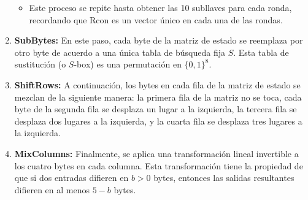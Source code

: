 \begin{enumerate}
\begin{itemize}
        \item Este proceso se repite hasta obtener las 10 subllaves para cada ronda, recordando que Rcon es un vector único en cada una de las rondas.
    \end{itemize}
    
    \item \textbf{SubBytes:} En este paso, cada byte de la matriz de estado se reemplaza por otro byte de acuerdo a una única tabla de búsqueda fija $S$. Esta tabla de sustitución (o $S$-box) es una permutación en $\{0,1\}^8$.
    
    \item \textbf{ShiftRows:}  A continuación, los bytes en cada fila de la matriz de estado se mezclan de la siguiente manera: la primera fila de la matriz no se toca, cada byte de la segunda fila se desplaza un lugar a la izquierda, la tercera fila se desplaza dos lugares a la izquierda, y la cuarta fila se desplaza tres lugares a la izquierda.
    
    \item \textbf{MixColumns:} Finalmente, se aplica una transformación lineal invertible a los cuatro bytes en cada columna. Esta transformación tiene la propiedad de que si dos entradas difieren en $b > 0$ bytes, entonces las salidas resultantes difieren en al menos $5 - b$ bytes.
\end{enumerate}

